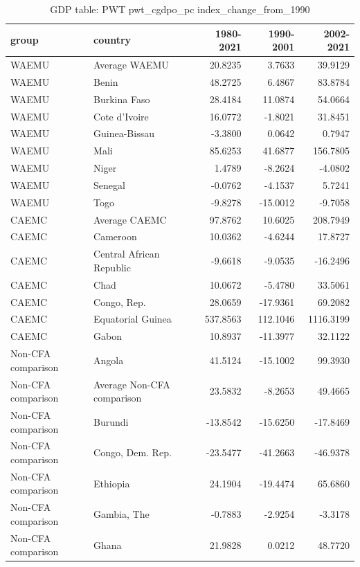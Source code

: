 \begin{table}

\caption{GDP table: PWT pwt_cgdpo_pc index_change_from_1990}
\centering
\begin{tabular}[t]{llrrr}
\toprule
group & country & 1980-2021 & 1990-2001 & 2002-2021\\
\midrule
WAEMU & Average WAEMU & 20.8235 & 3.7633 & 39.9129\\
WAEMU & Benin & 48.2725 & 6.4867 & 83.8784\\
WAEMU & Burkina Faso & 28.4184 & 11.0874 & 54.0664\\
WAEMU & Cote d'Ivoire & 16.0772 & -1.8021 & 31.8451\\
WAEMU & Guinea-Bissau & -3.3800 & 0.0642 & 0.7947\\
\addlinespace
WAEMU & Mali & 85.6253 & 41.6877 & 156.7805\\
WAEMU & Niger & 1.4789 & -8.2624 & -4.0802\\
WAEMU & Senegal & -0.0762 & -4.1537 & 5.7241\\
WAEMU & Togo & -9.8278 & -15.0012 & -9.7058\\
CAEMC & Average CAEMC & 97.8762 & 10.6025 & 208.7949\\
\addlinespace
CAEMC & Cameroon & 10.0362 & -4.6244 & 17.8727\\
CAEMC & Central African Republic & -9.6618 & -9.0535 & -16.2496\\
CAEMC & Chad & 10.0672 & -5.4780 & 33.5061\\
CAEMC & Congo, Rep. & 28.0659 & -17.9361 & 69.2082\\
CAEMC & Equatorial Guinea & 537.8563 & 112.1046 & 1116.3199\\
\addlinespace
CAEMC & Gabon & 10.8937 & -11.3977 & 32.1122\\
Non-CFA comparison & Angola & 41.5124 & -15.1002 & 99.3930\\
Non-CFA comparison & Average Non-CFA comparison & 23.5832 & -8.2653 & 49.4665\\
Non-CFA comparison & Burundi & -13.8542 & -15.6250 & -17.8469\\
Non-CFA comparison & Congo, Dem. Rep. & -23.5477 & -41.2663 & -46.9378\\
\addlinespace
Non-CFA comparison & Ethiopia & 24.1904 & -19.4474 & 65.6860\\
Non-CFA comparison & Gambia, The & -0.7883 & -2.9254 & -3.3178\\
Non-CFA comparison & Ghana & 21.9828 & 0.0212 & 48.7720\\

\end{tabular}
\end{table}
